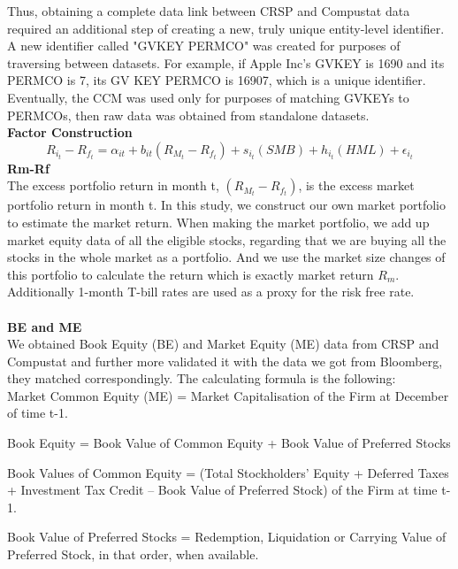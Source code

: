 \documentclass[12pt]{article}
\begin{document}
\noindent Thus, obtaining a complete data link between CRSP and Compustat data required an additional step of creating a new, truly unique entity-level identifier. A new identifier called "GVKEY PERMCO" was created for purposes of traversing between datasets.
For example, if Apple Inc’s GVKEY is 1690 and its PERMCO is 7, its GV KEY PERMCO is 16907, which is a unique identifier. Eventually, the CCM was used only for purposes of matching GVKEYs to PERMCOs, then raw data was obtained from standalone datasets.\\

\noindent \textbf{Factor Construction}\\
$$
R_{i_t}-R_{f_t}=\alpha_{it}+b_{it}(R_{M_t}-R_{f_t})+s_{i_t}(SMB)+h_{i_t}(HML)+\epsilon_{i_t}
$$
\textbf{Rm-Rf}\\
The excess portfolio return in month t, $(R_{M_t}-R_{f_t})$, is the excess market portfolio return in month t. In this study, we construct our own market portfolio to estimate the market return. When making the market portfolio, we add up market equity data of all the eligible stocks, regarding that we are buying all the stocks in the whole market as a portfolio. And we use the market size changes of this portfolio to calculate the return which is exactly market return $R_m$. Additionally 1-month T-bill rates are used as a proxy for the risk free rate.\\ \\
\textbf{BE and ME}\\
We obtained Book Equity (BE) and Market Equity (ME) data from CRSP and Compustat and further more validated it with the data we got from Bloomberg, they matched correspondingly.
The calculating formula is the following:\\

Market Common Equity (ME) = Market Capitalisation of the Firm at December of time t-1.

Book Equity = Book Value of Common Equity + Book Value of Preferred Stocks

Book Values of Common Equity  = (Total Stockholders’ Equity + Deferred Taxes + Investment Tax Credit – Book Value of Preferred Stock) of the Firm at time t-1.

Book Value of Preferred Stocks = Redemption, Liquidation or Carrying Value of Preferred Stock, in that order, when available.\\
\end{document}
